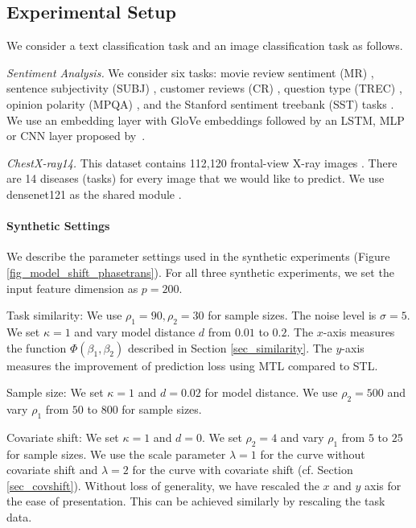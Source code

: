 \subsection{Experimental Setup}

We consider a text classification task and an image classification task as follows.

{\it Sentiment Analysis.} We consider six tasks: movie review sentiment (MR) \cite{pang2005seeing}, sentence subjectivity (SUBJ) \cite{pang2004sentimental}, customer reviews (CR) \cite{hu2004mining}, question type (TREC) \cite{li2002learning}, opinion polarity (MPQA) \cite{wiebe2005annotating}, and the Stanford sentiment treebank (SST) tasks \cite{socher2013recursive}.
We use an embedding layer with GloVe embeddings \cite{pennington2014glove}
followed by an LSTM, MLP or CNN layer proposed by~\cite{lei2018simple}.


{\it ChestX-ray14.} This dataset contains 112,120 frontal-view X-ray images \cite{chexnet17}.
There are 14 diseases (tasks) for every image that we would like to predict.
We use densenet121 as the shared module \cite{huang2017densely}.

\paragraph{Synthetic Settings}\label{app_synthetic}
	We describe the parameter settings used in the synthetic experiments (Figure \ref{fig_model_shift_phasetrans}).
	For all three synthetic experiments, we set the input feature dimension as $p = 200$.
	\squishlist
		\item Task similarity: We use $\rho_1 = 90, \rho_2 = 30$ for sample sizes.
	The noise level is $\sigma = 5$.
	We set $\kappa = 1$ and vary model distance $d$ from $0.01$ to $0.2$.
	The $x$-axis measures the function $\Phi(\beta_1, \beta_2)$ described in Section \ref{sec_similarity}.
	The $y$-axis measures the improvement of prediction loss using MTL compared to STL.
		\item Sample size: We set $\kappa = 1$ and $d = 0.02$ for model distance.
	We use $\rho_2 = 500$ and vary $\rho_1$ from $50$ to $800$ for sample sizes.
		\item Covariate shift: We set $\kappa = 1$ and $d = 0$.
	We set $\rho_2 = 4$ and vary $\rho_1$ from $5$ to $25$ for sample sizes.
	We use the scale parameter $\lambda = 1$ for the curve without covariate shift and $\lambda = 2$ for the curve with covariate shift (cf. Section \ref{sec_covshift}).
	Without loss of generality, we have rescaled the $x$ and $y$ axis for the ease of presentation.
	This can be achieved similarly by rescaling the task data.
	\squishend

